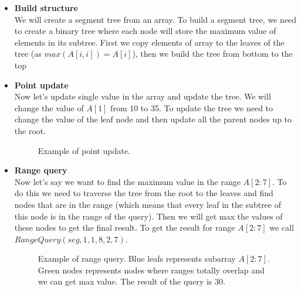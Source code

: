 \documentclass{article}
\begin{document}
\begin{itemize}
    \item \textbf{Build structure} \\
    We will create a segment tree from an array.
    To build a segment tree, we need to create a binary tree where each node will store the maximum value of elements in its subtree.
    First we copy elements of array to the leaves of the tree (as \(max(A[i, i]) = A[i]\)), then we build the tree from bottom to the top \\
    
    \FloatBarrier
    \item \textbf{Point update} \\
    Now let's update single value in the array and update the tree.
    We will change the value of \(A[1]\) from 10 to 35.
    To update the tree we need to change the value of the leaf node 
    and then update all the parent nodes up to the root.
    
    \begin{figure}[H]
        \centering
        
        \caption{Example of point update.}
        \label{fig:segment_tree_2}
    \end{figure}

    \item \textbf{Range query} \\
    Now let's say we want to find the maximum value in the range \(A[2:7]\).
    To do this we need to traverse the tree from the root to the leaves and 
    find nodes that are in the range (which means that every leaf in the subtree of this node is in the range of the query). 
    Then we will get max the values of these nodes to get the final result.
    To get the result for range \(A[2:7]\) we call \(RangeQuery(seg, 1, 1, 8, 2, 7)\).

    

    \begin{figure}[H]
        \centering
        
        \caption{Example of range query. Blue leafs represents subarray \(A[2:7]\). Green nodes 
        represents nodes where ranges totally overlap and we can get max value. The result of the query is 30.}
        \label{fig:segment_tree_3}
    \end{figure}

\end{itemize}
\end{document}
